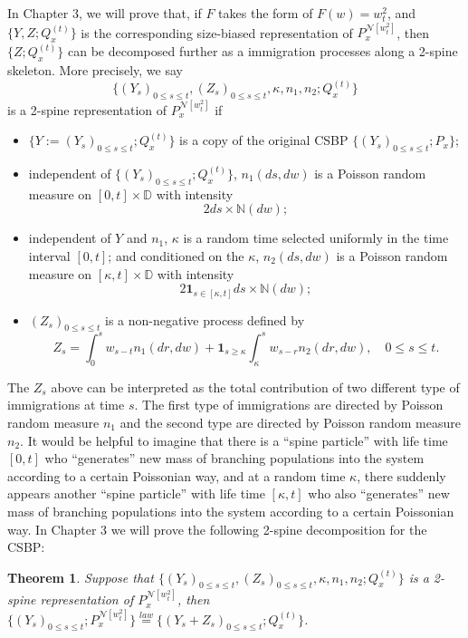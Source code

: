 \documentclass[UTF8]{pkuthss}
\theoremstyle{plain}
\newtheorem{thm}{Theorem}[section]
\theoremstyle{definition}
\numberwithin{equation}{section}
\begin{document}
	In Chapter 3, we will prove that, if $F$ takes the form of $F(w) = w_t^2$, and $\{Y,Z; Q_x^{(t)}\}$ is the corresponding size-biased representation of $P_x^{\mathcal N[w_t^2]}$, then $\{Z; Q_x^{(t)}\}$ can be decomposed further as a immigration processes along a 2-spine skeleton. More precisely, we say \[\{(Y_s)_{0\leq s\leq t}, (Z_s)_{0\leq s\leq t}, \kappa, n_1, n_2; Q_x^{(t)}\}\] is a 2-spine representation of $P_x^{\mathcal N[w_t^2]}$ if
\begin{itemize}
\item
	$\{Y:=(Y_s)_{0\leq s\leq t}; Q_x^{(t)}\}$ is a copy of the original CSBP $\{(Y_s)_{0\leq s\leq t}; P_x\}$;
\item
	independent of $\{(Y_s)_{0\leq s\leq t}; Q_x^{(t)}\}$, $n_1(ds,dw)$ is a Poisson random measure on $[0,t]\times \mathbb D$ with intensity
\[
	2ds\times \mathbb N(dw);
\]
\item
	independent of $Y$ and $n_1$, $\kappa$ is a random time selected uniformly in the time interval $[0,t]$; and conditioned on the $\kappa$, $n_2(ds,dw)$ is a Poisson random measure on $[\kappa, t]\times \mathbb D$ with intensity
\[
	2\mathbf 1_{s\in [\kappa, t]}ds \times \mathbb N(dw);
\]
\item
	$(Z_s)_{0\leq s\leq t}$ is a non-negative process defined by
\[
	Z_s = \int_0^s w_{s-t} n_1(dr,dw) + \mathbf 1_{s\geq \kappa}\int_{\kappa}^s w_{s-r}n_2(dr,dw),\quad 0\leq s\leq t.
\]
\end{itemize}
	The $Z_s$ above can be interpreted as the total contribution of two different type of immigrations at time $s$. The first type of immigrations are directed by Poisson random measure $n_1$ and the second type are directed by Poisson random measure $n_2$. It would be helpful to imagine that there is a ``spine particle'' with life time $[0,t]$ who ``generates'' new mass of branching populations into the system according to a certain Poissonian way, and at a random time $\kappa$, there suddenly appears another ``spine particle'' with life time $[\kappa, t]$ who also ``generates'' new mass of branching populations into the system according to a certain Poissonian way. 
	In Chapter 3 we will prove the following 2-spine decomposition for the CSBP:
\begin{thm}
\label{thm: 2-spine decomposition for CSBP}
	Suppose that $\{(Y_s)_{0\leq s\leq t}, (Z_s)_{0\leq s\leq t}, \kappa, n_1, n_2; Q_x^{(t)}\}$ is a 2-spine representation of $P_x^{\mathcal N[w_t^2]}$, then $\{(Y_s)_{0\leq s\leq t}; P_x^{\mathcal N[w_t^2]}\}\overset{law}{=}\{(Y_s + Z_s)_{0\leq s\leq t}; Q_x^{(t)}\}$.
\end{thm}
	
\end{document}
